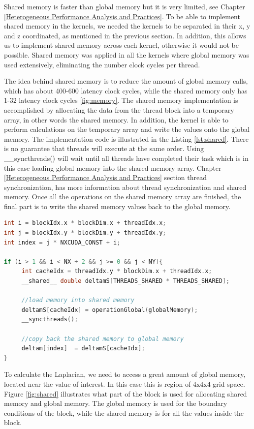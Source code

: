 Shared memory is faster than global memory but it is very limited, see Chapter \ref{Heterogeneous Performance Analysis and Practices}. To be able to implement shared memory in the kernels, we needed the kernels to be separated in their x, y and z coordinated, as mentioned in the previous section. In addition, this allows us to implement shared memory across each kernel, otherwise it would not be possible. Shared memory was applied in all the kernels where global memory was used extensively, eliminating the number clock cycles per thread.

The idea behind shared memory is to reduce the amount of global memory calls, which has about 400-600 latency clock cycles, while the shared memory only has 1-32 latency clock cycles \ref{fig:memory}. The shared memory implementation is accomplished by allocating the data from the thread block into a temporary array, in other words the shared memory. In addition, the kernel is able to perform calculations on the temporary array and write the values onto the global memory. The implementation code is illustrated in the Listing \ref{lst:shared}. There is no guarantee that threads will execute at the same order. Using {\listf \_\_syncthreads()} will wait until all threads have completed their task which is in this case loading global memory into the shared memory array. Chapter \ref{Heterogeneous Performance Analysis and Practices} section thread synchronization, has more information about thread synchronization and shared memory. Once all the operations on the shared memory array are finished, the final part is to write the shared memory values back to the global memory.

\begin{lstlisting}[language=C++, label={lst:shared}, caption={Shared memory}]
int i = blockIdx.x * blockDim.x + threadIdx.x;
int j = blockIdx.y * blockDim.y + threadIdx.y;
int index = j * NXCUDA_CONST + i;

if (i > 1 && i < NX + 2 && j >= 0 && j < NY){
     int cacheIdx = threadIdx.y * blockDim.x + threadIdx.x;
     __shared__ double deltamS[THREADS_SHARED * THREADS_SHARED];

	 //load memory into shared memory
     deltamS[cacheIdx] = operationGlobal(globalMemory);
     __syncthreads();

	 //copy back the shared memory to global memory
     deltam[index]  = deltamS[cacheIdx];
}
\end{lstlisting}

To calculate the Laplacian, we need to access a great amount of global memory, located near the value of interest. In this case this is region of 4x4x4 grid space. Figure \ref{fig:shared} illustrates what part of the block is used for allocating shared memory and global memory. The global memory is used for the boundary conditions of the block, while the shared memory is for all the values inside the block.

